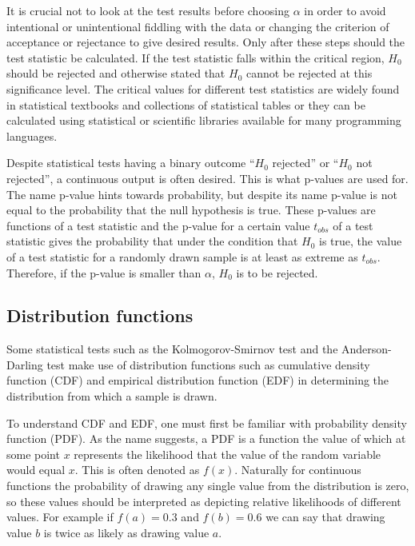 \documentclass[english, twoside]{HYgradu}
\begin{document}
It is crucial not to look at the test results before choosing $\alpha$ in order to avoid intentional or unintentional fiddling with the data or changing the criterion of acceptance or rejectance to give desired results. Only after these steps should the test statistic be calculated. If the test statistic falls within the critical region, $H_0$ should be rejected and otherwise stated that $H_0$ cannot be rejected at this significance level. The critical values for different test statistics are widely found in statistical textbooks and collections of statistical tables or they can be calculated using statistical or scientific libraries available for many programming languages.

Despite statistical tests having a binary outcome ``$H_0$ rejected'' or ``$H_0$ not rejected'', a continuous output is often desired. This is what p-values are used for. The name p-value hints towards probability, but despite its name p-value is not equal to the probability that the null hypothesis is true. These p-values are functions of a test statistic and the p-value for a certain value $t_{obs}$ of a test statistic gives the probability that under the condition that $H_0$ is true, the value of a test statistic for a randomly drawn sample is at least as extreme as $t_{obs}$. Therefore, if the p-value is smaller than $\alpha$, $H_0$ is to be rejected.

\subsection{Distribution functions} \label{sect:distribution-functions}
Some statistical tests such as the Kolmogorov-Smirnov test and the Anderson-Darling test make use of distribution functions such as cumulative density function (CDF) and empirical distribution function (EDF) in determining the distribution from which a sample is drawn. %

To understand CDF and EDF, one must first be familiar with probability density function (PDF).
As the name suggests, a PDF is a function the value of which at some point $x$ represents the likelihood that the value of the random variable would equal $x$. This is often denoted as $f(x)$. Naturally for continuous functions the probability of drawing any single value from the distribution is zero, so these values should be interpreted as depicting relative likelihoods of different values. For example if $f(a)=0.3$ and $f(b)=0.6$ we can say that drawing value $b$ is twice as likely as drawing value $a$. \citep{htk}
\end{document}

